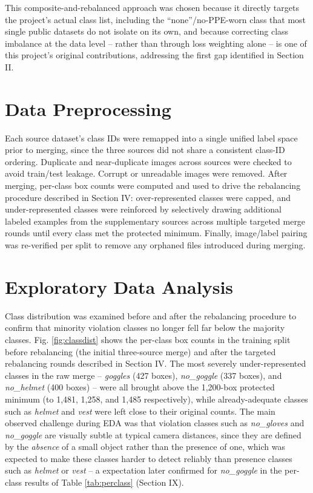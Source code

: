 \documentclass[conference]{IEEEtran}
\begin{document}
This composite-and-rebalanced approach was chosen because it directly targets the project's actual class list, including the ``none''/no-PPE-worn class that most single public datasets do not isolate on its own, and because correcting class imbalance at the data level -- rather than through loss weighting alone -- is one of this project's original contributions, addressing the first gap identified in Section II.

\section{Data Preprocessing}

Each source dataset's class IDs were remapped into a single unified label space prior to merging, since the three sources did not share a consistent class-ID ordering. Duplicate and near-duplicate images across sources were checked to avoid train/test leakage. Corrupt or unreadable images were removed. After merging, per-class box counts were computed and used to drive the rebalancing procedure described in Section IV: over-represented classes were capped, and under-represented classes were reinforced by selectively drawing additional labeled examples from the supplementary sources across multiple targeted merge rounds until every class met the protected minimum. Finally, image/label pairing was re-verified per split to remove any orphaned files introduced during merging.

\section{Exploratory Data Analysis}

Class distribution was examined before and after the rebalancing procedure to confirm that minority violation classes no longer fell far below the majority classes. Fig. \ref{fig:classdist} shows the per-class box counts in the training split before rebalancing (the initial three-source merge) and after the targeted rebalancing rounds described in Section IV. The most severely under-represented classes in the raw merge -- \textit{goggles} (427 boxes), \textit{no\_goggle} (337 boxes), and \textit{no\_helmet} (400 boxes) -- were all brought above the 1,200-box protected minimum (to 1,481, 1,258, and 1,485 respectively), while already-adequate classes such as \textit{helmet} and \textit{vest} were left close to their original counts. The main observed challenge during EDA was that violation classes such as \textit{no\_gloves} and \textit{no\_goggle} are visually subtle at typical camera distances, since they are defined by the \emph{absence} of a small object rather than the presence of one, which was expected to make these classes harder to detect reliably than presence classes such as \textit{helmet} or \textit{vest} -- a expectation later confirmed for \textit{no\_goggle} in the per-class results of Table \ref{tab:perclass} (Section IX).
\end{document}
